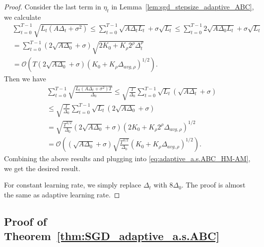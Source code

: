 \documentclass{article}
\newcommand{\Kr}{K_{\rho}}
\newcommand{\paren}[1]{\left( #1 \right)}
\begin{document}
\begin{proof}
    Consider the last term in $\eta_t$ in Lemma~\ref{lem:sgd_stepsize_adaptive_ABC}, we calculate
    \begin{align*}
        &\sum_{t=0}^{T-1} \sqrt{L_t\paren{A\Delta_t+\sigma^2}}
        \leq \sum_{t=0}^{T-1} \sqrt{A\Delta_tL_t}+\sigma\sqrt{L_t}
        \leq
        \sum_{t=0}^{T-1} 2\sqrt{A\Delta_0L_t}+\sigma\sqrt{L_t}\\
        &=\sum_{t=0}^{T-1}\paren{2\sqrt{A\Delta_0}+\sigma}\sqrt{2K_0+\Kr2^\rho\Delta_t^\rho}\\
        &=\mathcal{O}\paren{T\paren{2\sqrt{A\Delta_0}+\sigma}\paren{K_0+\Kr\Delta_{avg,\rho}}^{1/2}}.
    \end{align*}
    Then we have
    \begin{align*}
        &\sum_{t=0}^{T-1}\sqrt{\frac{L_t\paren{A\Delta_t+\sigma^2}T}{\Delta_0}}\leq\sqrt{\frac{T}{\Delta_0}}\sum_{t=0}^{T-1}\sqrt{L_t}\paren{\sqrt{A\Delta_t}+\sigma}\\
        &\leq \sqrt{\frac{T}{\Delta_0}}\sum_{t=0}^{T-1}\sqrt{L_t}\paren{2\sqrt{A\Delta_0}+\sigma}\\
        &=\sqrt{\frac{T^{3/2}}{\Delta_0}}\paren{2\sqrt{A\Delta_0}+\sigma}\paren{2K_0+\Kr2^\rho\Delta_{avg,\rho}}^{1/2}\\
        &=\mathcal{O}\paren{\paren{\sqrt{A\Delta_0}+\sigma}\sqrt{\frac{T^{3/2}}{\Delta_0}}\paren{K_0+\Kr\Delta_{avg,\rho}}^{1/2}}.
    \end{align*}
    Combining the above results and plugging into \eqref{eq:adaptive_a.s.ABC_HM-AM}, we get the desired result.

    For constant learning rate, we simply replace $\Delta_t$ with $8\Delta_0$. 
    The proof is almost the same as adaptive learning rate.

    
\end{proof}



\subsection{Proof of Theorem~\ref{thm:SGD_adaptive_a.s.ABC}}\label{Apx:proof_thm_a.s.ABC_adaptive}
\end{document}

